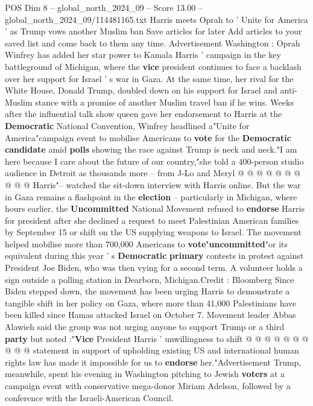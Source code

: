 \begin{textsample}{POS Dim 8 – global\_north\_2024\_09 – Score 13.00 – global\_north\_2024\_09/114481165.txt}  \label{ex:f8_pos_088}
Harris meets Oprah to ' Unite for America ' as Trump vows another Muslim ban Save articles for later Add articles to your saved list and come back to them any time.
Advertisement Washington : Oprah Winfrey has added her star power to Kamala Harris ' campaign in the key battleground of Michigan, where the \textbf{vice} president continues to face a backlash over her support for Israel ' s war in Gaza.
At the same time, her rival for the White House, Donald Trump, doubled down on his support for Israel and anti-Muslim stance with a promise of another Muslim travel ban if he wins.
Weeks after the influential talk show queen gave her endorsement to Harris at the \textbf{Democratic} National Convention, Winfrey headlined a"Unite for America"campaign event to mobilise Americans to \textbf{vote} for the \textbf{Democratic} \textbf{candidate} amid \textbf{polls} showing the race against Trump is neck and neck."I am here because I care about the future of our country,"she told a 400-person studio audience in Detroit as thousands more -- from J-Lo and Meryl @ @ @ @ @ @ @ @ @ @ Harris"-- watched the sit-down interview with Harris online.
But the war in Gaza remains a flashpoint in the \textbf{election} -- particularly in Michigan, where hours earlier, the \textbf{Uncommitted} National Movement refused to \textbf{endorse} Harris for president after she declined a request to meet Palestinian American families by September 15 or shift on the US supplying weapons to Israel.
The movement helped mobilise more than 700,000 Americans to \textbf{vote}"\textbf{uncommitted}"or its equivalent during this year ' s \textbf{Democratic} \textbf{primary} contests in protest against President Joe Biden, who was then vying for a second term.
A volunteer holds a sign outside a polling station in Dearborn, Michigan.Credit : Bloomberg Since Biden stepped down, the movement has been urging Harris to demonstrate a tangible shift in her policy on Gaza, where more than 41,000 Palestinians have been killed since Hamas attacked Israel on October 7.
Movement leader Abbas Alawieh said the group was not urging anyone to support Trump or a third \textbf{party} but noted :"\textbf{Vice} President Harris ' unwillingness to shift @ @ @ @ @ @ @ @ @ @ statement in support of upholding existing US and international human rights law has made it impossible for us to \textbf{endorse} her."Advertisement Trump, meanwhile, spent his evening in Washington pitching to Jewish \textbf{voters} at a campaign event with conservative mega-donor Miriam Adelson, followed by a conference with the Israeli-American Council.

\end{textsample}
